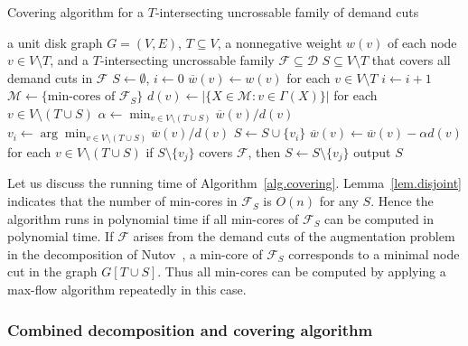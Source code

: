\documentclass[11pt]{article}
\newcommand{\Ffam}{\mathcal{F}}
\newcommand{\Mfam}{\mathcal{M}}
\newcommand{\Dfam}{\mathcal{D}}
\begin{document}
     \begin{algorithm}
  \caption{Covering algorithm for a $T$-intersecting uncrossable family of demand cuts}
  \label{alg.covering}
  \begin{algorithmic}
   \REQUIRE
   a unit disk graph $G=(V,E)$, $T  \subseteq V$,
   a nonnegative weight $w(v)$ of each node $v \in V \setminus T$,
   and a $T$-intersecting uncrossable family $\Ffam \subseteq \Dfam$ 
   \ENSURE $S \subseteq V \setminus T$ that covers all demand cuts in $\Ffam$
   \STATE  $S \longleftarrow \emptyset$, $i \leftarrow 0$
   \STATE $\overline{w}(v) \longleftarrow w(v)$ for each $v \in V
   \setminus T$
   \WHILE{$\Ffam_S:= \{X \in \Ffam \colon S \cap \Gamma(X)=\emptyset\} \neq \emptyset$}
   \STATE $i \longleftarrow i+1$
   \STATE $\Mfam \leftarrow \{\text{min-cores of } \Ffam_S\}$
   \STATE $d(v) \longleftarrow |\{X \in \Mfam \colon v \in
   \Gamma(X)\}|$ for each $v \in V \setminus (T \cup S)$
   \STATE
   $\alpha \leftarrow \min_{v \in V \setminus (T \cup S)}
   \overline{w}(v)/d(v)$
   \STATE  $v_i \leftarrow \arg \min_{v \in V \setminus (T \cup S)}
   \overline{w}(v)/d(v)$
   \STATE $S \longleftarrow S \cup \{v_i\}$
   \STATE $\overline{w}(v) \longleftarrow \overline{w}(v) - \alpha d(v)$
   for each $v \in V\setminus (T \cup S)$
   \ENDWHILE
   \STATE if $S \setminus \{v_j\}$ covers $\Ffam$, then $S \leftarrow S \setminus \{v_j\}$
   \ENDFOR
   \STATE output $S$
  \end{algorithmic}
   \end{algorithm}



   

Let us discuss the running time of Algorithm~\ref{alg.covering}.
Lemma~\ref{lem.disjoint} indicates that the number of
min-cores in $\Ffam_S$ is $O(n)$ for any $S$.
Hence the algorithm runs in polynomial time if all min-cores of
$\Ffam_S$ can be computed in polynomial time.
If $\Ffam$ arises from the demand cuts of the augmentation problem in
the decomposition of Nutov~\cite{Nutov12},
a min-core of 
$\Ffam_S$ corresponds to a minimal node cut in the graph $G[T\cup S]$.
Thus all min-cores can be computed by applying a max-flow algorithm
repeatedly in this case.
  
  \subsubsection{Combined decomposition and covering algorithm}
  \label{ssec.combine}
  
\end{document}
